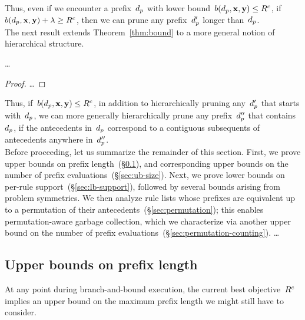 Thus, even if we encounter a prefix~$d_p$
with lower bound~${b(d_p, \mathbf{x}, \mathbf{y}) \le {R^c}}$,
if ${b(d_p, \mathbf{x}, \mathbf{y}) + {\lambda} \ge {R^c}}$,
then we can prune any prefix~$d_p'$ longer than~$d_p$. \\

The next result extends Theorem~\ref{thm:bound} to a more
general notion of hierarchical structure.

\begin{lemma}
\dots
\end{lemma}

\begin{proof}
\dots
\end{proof}

Thus, if~${b(d_p, \mathbf{x}, \mathbf{y}) \le {R^c}}$, in addition to
hierarchically pruning any~$d_p'$ that starts with~$d_p$,
we can more generally hierarchically prune any prefix~$d_p''$
that contains~$d_p$, \ie if the antecedents in~$d_p$
correspond to a contiguous subsequents of antecedents
anywhere in~$d_p''$. \\

Before proceeding, let us summarize the remainder of this section.
%
First, we prove upper bounds on prefix
length~(\S\ref{sec:ub-prefix-length}),
and corresponding upper bounds on the number of
prefix evaluations~(\S\ref{sec:ub-size}).
%
Next, we prove lower bounds on per-rule support~(\S\ref{sec:lb-support}),
followed by several bounds arising from problem symmetries.
%
We then analyze rule lists whose prefixes are equivalent up to
a permutation of their antecedents~(\S\ref{sec:permutation});
this enables permutation-aware garbage collection, which we
characterize via another upper bound on the number of prefix evaluations~(\S\ref{sec:permutation-counting}).
%
\dots

\subsection{Upper bounds on prefix length}
\label{sec:ub-prefix-length}

At any point during branch-and-bound execution, the current best objective~${R^c}$
implies an upper bound on the maximum prefix length we might still have to consider.

